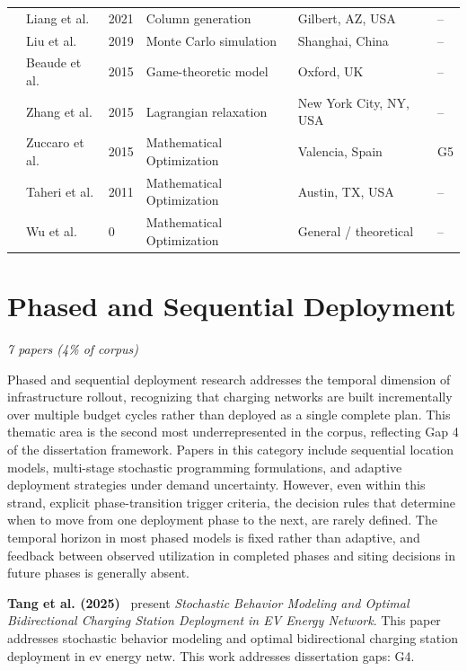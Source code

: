 \documentclass[letterpaper, 12pt, oneside, doublespacing]{Thesis}
\begin{document}
\begin{longtable}{L{0.9cm} L{2.2cm} L{0.8cm} L{3.3cm} L{2.5cm} L{1.5cm}}
\cite{the_electric_2021} & Liang et al. & 2021 & Column generation & Gilbert, AZ, USA & -- \\
\cite{load_forecasting_2019} & Liu et al. & 2019 & Monte Carlo simulation & Shanghai, China & -- \\
\cite{composite_charging_2015} & Beaude et al. & 2015 & Game-theoretic model & Oxford, UK & -- \\
\cite{scalable_electric_2015} & Zhang et al. & 2015 & Lagrangian relaxation & New York City, NY, USA & -- \\
\cite{smart_vehicle_2015} & Zuccaro et al. & 2015 & Mathematical Optimization & Valencia, Spain & G5 \\
\cite{a_dynamic_2011} & Taheri et al. & 2011 & Mathematical Optimization & Austin, TX, USA & -- \\
\cite{allocate_electric_0} & Wu et al. & 0 & Mathematical Optimization & General {\slash} theoretical & -- \\
\bottomrule
\end{longtable}


\section{Phased and Sequential Deployment}

\textit{7 papers (4\% of corpus)}

Phased and sequential deployment research addresses the temporal dimension of infrastructure rollout, recognizing that charging networks are built incrementally over multiple budget cycles rather than deployed as a single complete plan. This thematic area is the second most underrepresented in the corpus, reflecting Gap 4 of the dissertation framework. Papers in this category include sequential location models, multi-stage stochastic programming formulations, and adaptive deployment strategies under demand uncertainty. However, even within this strand, explicit phase-transition trigger criteria, the decision rules that determine when to move from one deployment phase to the next, are rarely defined. The temporal horizon in most phased models is fixed rather than adaptive, and feedback between observed utilization in completed phases and siting decisions in future phases is generally absent.


\noindent \textbf{Tang et al. (2025)}~\cite{stochastic_behavior_2025} present \textit{Stochastic Behavior Modeling and Optimal Bidirectional Charging Station Deployment in EV Energy Network}. This paper addresses stochastic behavior modeling and optimal bidirectional charging station deployment in ev energy netw. This work addresses dissertation gaps: G4.
\end{document}
